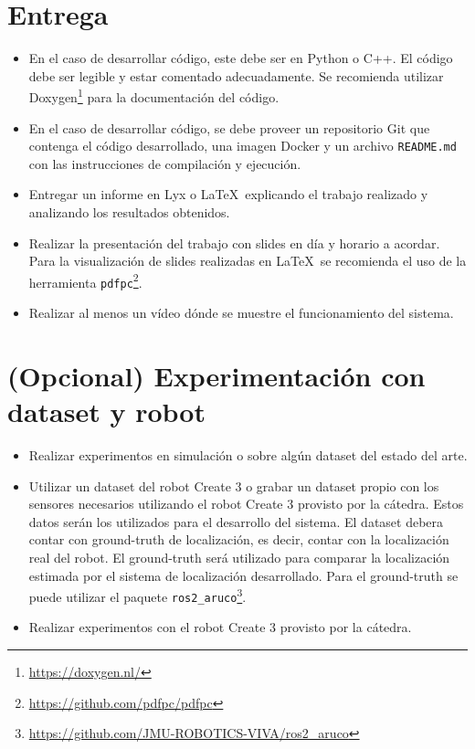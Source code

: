 \documentclass[tp]{lcc}
\begin{document}
	\section{Entrega}
	\begin{itemize}
		
		\item En el caso de desarrollar código, este debe ser en Python o C++. El código debe ser legible y estar comentado adecuadamente. Se recomienda utilizar Doxygen\footnote{\url{https://doxygen.nl/}} para la documentación del código.
		
		\item En el caso de desarrollar código, se debe proveer un repositorio Git que contenga el código desarrollado, una imagen Docker y un archivo \lstinline{README.md} con las instrucciones de compilación y ejecución.
		
		\item Entregar un informe en Lyx o \LaTeX\  explicando el trabajo realizado y analizando los resultados obtenidos.

		\item Realizar la presentación del trabajo con slides en día y horario a acordar. Para la visualización de slides realizadas en \LaTeX\ se recomienda el uso de la herramienta \lstinline{pdfpc}\footnote{\url{https://github.com/pdfpc/pdfpc}}.
        
        \item Realizar al menos un vídeo dónde se muestre el funcionamiento del sistema.         
	\end{itemize}

	
	\section{(Opcional) Experimentación con dataset y robot}
	\begin{itemize}
        
        \item Realizar experimentos en simulación o sobre algún dataset del estado del arte.
        
		\item Utilizar un dataset del robot Create 3 o grabar un dataset propio con los sensores necesarios utilizando el robot Create 3 provisto por la cátedra. Estos datos serán los utilizados para el desarrollo del sistema. El dataset debera contar con ground-truth de localización, es decir, contar con la localización real del robot. El ground-truth será utilizado para comparar la localización estimada por el sistema de localización desarrollado. Para el ground-truth se puede utilizar el paquete \lstinline{ros2_aruco}\footnote{\url{https://github.com/JMU-ROBOTICS-VIVA/ros2_aruco}}. 
		
		\item Realizar experimentos con el robot Create 3 provisto por la cátedra.
	\end{itemize}
	
\end{document}
